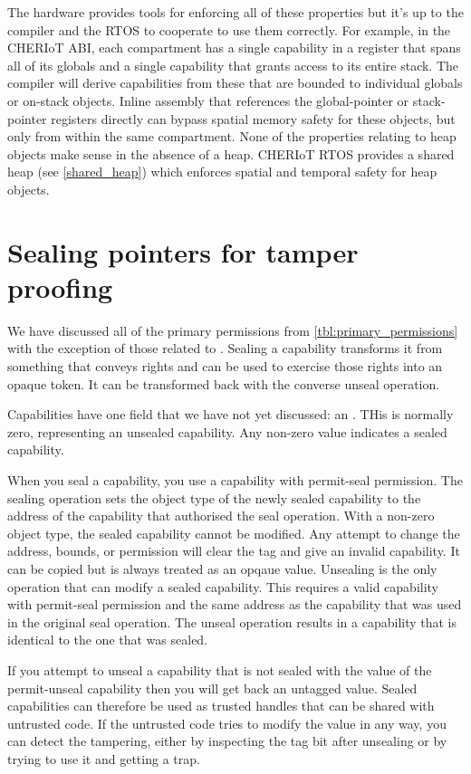 The hardware provides tools for enforcing all of these properties but it's up to the compiler and the RTOS to cooperate to use them correctly.
For example, in the CHERIoT ABI, each compartment has a single capability in a register that spans all of its globals and a single capability that grants access to its entire stack.
The compiler will derive capabilities from these that are bounded to individual globals or on-stack objects.
Inline assembly that references the global-pointer or stack-pointer registers directly can bypass spatial memory safety for these objects, but only from within the same compartment.
None of the properties relating to heap objects make sense in the absence of a heap.
CHERIoT RTOS provides a shared heap (see \ref{shared_heap}) which enforces spatial and temporal safety for heap objects.

\section[label=sealing_intro]{Sealing pointers for tamper proofing}

We have discussed all of the primary permissions from \ref{tbl:primary_permissions} with the exception of those related to .
Sealing a capability transforms it from something that conveys rights and can be used to exercise those rights into an opaque token.
It can be transformed back with the converse unseal operation.

Capabilities have one field that we have not yet discussed: an .
THis is normally zero, representing an unsealed capability.
Any non-zero value indicates a sealed capability.

When you seal a capability, you use a capability with permit-seal permission.
The sealing operation sets the object type of the newly sealed capability to the address of the capability that authorised the seal operation.
With a non-zero object type, the sealed capability cannot be modified.
Any attempt to change the address, bounds, or permission will clear the tag and give an invalid capability.
It can be copied but is always treated as an opqaue value.
Unsealing is the only operation that can modify a sealed capability.
This requires a valid capability with permit-seal permission and the same address as the capability that was used in the original seal operation.
The unseal operation results in a capability that is identical to the one that was sealed.

If you attempt to unseal a capability that is not sealed with the value of the permit-unseal capability then you will get back an untagged value.
Sealed capabilities can therefore be used as trusted handles that can be shared with untrusted code.
If the untrusted code tries to modify the value in any way, you can detect the tampering, either by inspecting the tag bit after unsealing or by trying to use it and getting a trap.

